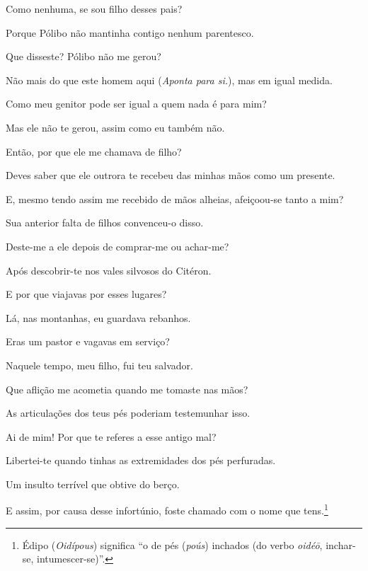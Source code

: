    Como nenhuma, se sou filho desses pais?

   Porque Pólibo não mantinha contigo nenhum parentesco.

   Que disseste? Pólibo não me gerou?

  Não mais do que este homem aqui (\emph{Aponta para si.}), mas em igual
medida.

   Como meu genitor pode ser igual a quem nada é para mim?

   Mas ele não te gerou, assim como eu também não.

   Então, por que ele me chamava de filho?

   Deves saber que ele outrora te recebeu das minhas mãos como um presente.

   E, mesmo tendo assim me recebido de mãos alheias, afeiçoou-se tanto a
mim?

   Sua anterior falta de filhos convenceu-o disso.

   Deste-me a ele depois de comprar-me ou achar-me?

   Após descobrir-te nos vales silvosos do Citéron.

   E por que viajavas por esses lugares?

   Lá, nas montanhas, eu guardava rebanhos.

   Eras um pastor e vagavas em serviço?

   Naquele tempo, meu filho, fui teu salvador.

   Que aflição me acometia quando me tomaste nas mãos?

   As articulações dos teus pés poderiam testemunhar isso.

   Ai de mim! Por que te referes a esse antigo mal?

   Libertei-te quando tinhas as extremidades dos pés perfuradas.

   Um insulto terrível que obtive do berço.

   E assim, por causa desse infortúnio, foste chamado com o nome que
tens.\footnote{Édipo (\emph{Oidípous}) significa ``o de pés (\emph{poús})
  inchados (do verbo \emph{oidéō}, inchar-se, intumescer-se)''.}

